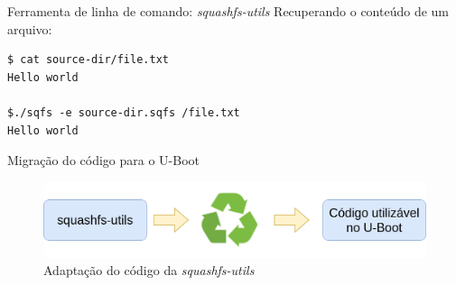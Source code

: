 \begin{frame}[fragile]{Ferramenta de linha de comando: \textit{squashfs-utils}}
Recuperando o conteúdo de um arquivo:
\begin{verbatim}
$ cat source-dir/file.txt
Hello world

$./sqfs -e source-dir.sqfs /file.txt
Hello world
\end{verbatim}
\end{frame}

\begin{frame}{Migração do código para o U-Boot}
    \begin{figure}
        \centering
        \includegraphics[scale=0.27]{figuras/recycle_transparente.png}
        \caption{Adaptação do código da \textit{squashfs-utils}}
        \label{fig:my_label}
    \end{figure}
\end{frame}

